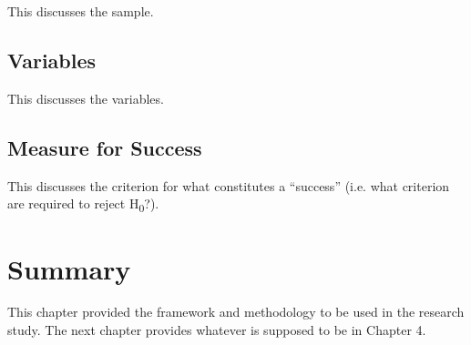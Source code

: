 This discusses the sample.


\subsection{Variables}

This discusses the variables.


\subsection{Measure for Success}

This discusses the criterion for what constitutes a ``success'' (i.e. what criterion are required to reject H\textsubscript{0}?).


\section{Summary}

This chapter provided the framework and methodology to be used in the research study.
The next chapter provides whatever is supposed to be in Chapter 4.